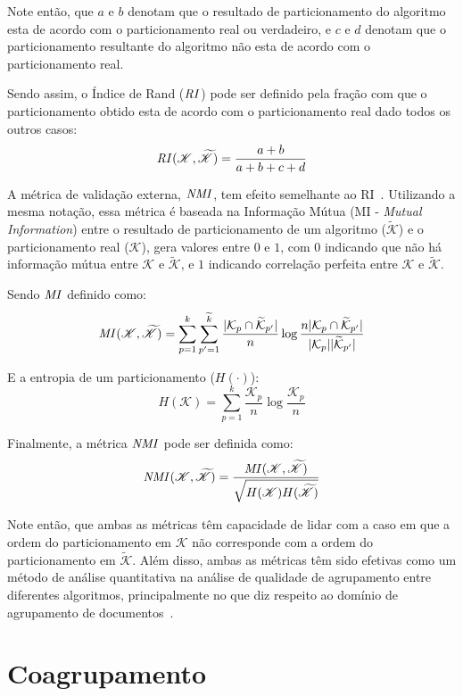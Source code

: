 \documentclass[
    12pt,                %
    oneside,            %
    a4paper,            %
    english,            %
    brazil                %
    ]{abntex2ppgsi}
\begin{document}
Note então, que $a$ e $b$ denotam que o resultado de particionamento do algoritmo esta de acordo com o particionamento real ou verdadeiro, e $c$ e $d$ denotam que o particionamento resultante do algoritmo não esta de acordo com o particionamento real.

Sendo assim, o Índice de Rand ($\text{\textit{RI}}$) pode ser definido pela fração com que o particionamento obtido esta de acordo com o particionamento real dado todos os outros casos:
\[
    \text{\textit{RI}}(\mathscr{K}, \mathscr{\widetilde{K}}) = \frac{a + b}{a + b + c + d}
\]

A métrica de validação externa, $\text{\textit{NMI}}$, tem efeito semelhante ao RI~\cite{Manning2008}.
Utilizando a mesma notação, essa métrica é baseada na Informação Mútua (MI - \textit{Mutual Information}) entre o resultado de particionamento de um algoritmo ($\mathscr{\widetilde{K}}$) e o particionamento real ($\mathscr{K}$), gera valores entre $0$ e $1$, com $0$ indicando que não há informação mútua entre $\mathscr{K}$ e $\mathscr{\widetilde{K}}$, e $1$ indicando correlação perfeita entre $\mathscr{K}$ e $\mathscr{\widetilde{K}}$.

Sendo $\text{\textit{MI}}$ definido como:
\[
    \text{\textit{MI}}(\mathscr{K}, \mathscr{\widetilde{K}}) = \displaystyle \sum_{p=1}^k \sum_{p'=1}^{\widetilde{k}} \frac{|\mathcal{K}_p \cap \mathcal{\widetilde{K}}_{p'}|}{n} \log \frac{n |\mathcal{K}_p \cap \mathcal{\widetilde{K}}_{p'}|}{|\mathcal{K}_p| |\mathcal{\widetilde{K}}_{p'}|}
\]

E a entropia de um particionamento ($H(\cdot)$):
\[
    H(\mathscr{K}) = \displaystyle \sum_{p=1}^k \frac{\mathcal{K}_p}{n} \log \frac{\mathcal{K}_p}{n}
\]

Finalmente, a métrica $\text{\textit{NMI}}$ pode ser definida como:
\[
    \text{\textit{NMI}}(\mathscr{K}, \mathscr{\widetilde{K}}) = \frac{\text{\textit{MI}}(\mathscr{K}, \mathscr{\widetilde{K}})}{\sqrt{H(\mathscr{K}) H(\mathscr{\widetilde{K}})}}
\]

Note então, que ambas as métricas têm capacidade de lidar com a caso em que a ordem do particionamento em $\mathscr{K}$ não corresponde com a ordem do particionamento em $\mathscr{\widetilde{K}}$.
Além disso, ambas as métricas têm sido efetivas como um método de análise quantitativa na análise de qualidade de agrupamento entre diferentes algoritmos, principalmente no que diz respeito ao domínio de agrupamento de documentos~\cite{Kuang2014,Ho2008,Wang2011,Ding06,Xu2003,Yoo2010}.

\section{Coagrupamento}
\label{sec:coclustering}
\end{document}
